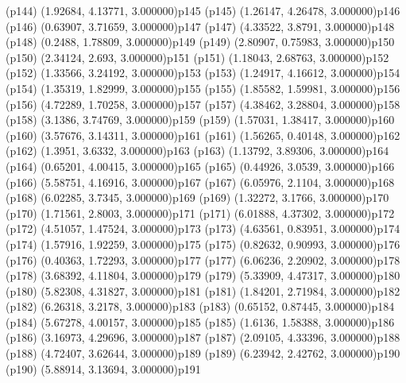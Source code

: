 \psdot(p144)
\psPoint(1.92684, 4.13771, 3.000000){p145}
\psdot(p145)
\psPoint(1.26147, 4.26478, 3.000000){p146}
\psdot(p146)
\psPoint(0.63907, 3.71659, 3.000000){p147}
\psdot(p147)
\psPoint(4.33522, 3.8791, 3.000000){p148}
\psdot(p148)
\psPoint(0.2488, 1.78809, 3.000000){p149}
\psdot(p149)
\psPoint(2.80907, 0.75983, 3.000000){p150}
\psdot(p150)
\psPoint(2.34124, 2.693, 3.000000){p151}
\psdot(p151)
\psPoint(1.18043, 2.68763, 3.000000){p152}
\psdot(p152)
\psPoint(1.33566, 3.24192, 3.000000){p153}
\psdot(p153)
\psPoint(1.24917, 4.16612, 3.000000){p154}
\psdot(p154)
\psPoint(1.35319, 1.82999, 3.000000){p155}
\psdot(p155)
\psPoint(1.85582, 1.59981, 3.000000){p156}
\psdot(p156)
\psPoint(4.72289, 1.70258, 3.000000){p157}
\psdot(p157)
\psPoint(4.38462, 3.28804, 3.000000){p158}
\psdot(p158)
\psPoint(3.1386, 3.74769, 3.000000){p159}
\psdot(p159)
\psPoint(1.57031, 1.38417, 3.000000){p160}
\psdot(p160)
\psPoint(3.57676, 3.14311, 3.000000){p161}
\psdot(p161)
\psPoint(1.56265, 0.40148, 3.000000){p162}
\psdot(p162)
\psPoint(1.3951, 3.6332, 3.000000){p163}
\psdot(p163)
\psPoint(1.13792, 3.89306, 3.000000){p164}
\psdot(p164)
\psPoint(0.65201, 4.00415, 3.000000){p165}
\psdot(p165)
\psPoint(0.44926, 3.0539, 3.000000){p166}
\psdot(p166)
\psPoint(5.58751, 4.16916, 3.000000){p167}
\psdot(p167)
\psPoint(6.05976, 2.1104, 3.000000){p168}
\psdot(p168)
\psPoint(6.02285, 3.7345, 3.000000){p169}
\psdot(p169)
\psPoint(1.32272, 3.1766, 3.000000){p170}
\psdot(p170)
\psPoint(1.71561, 2.8003, 3.000000){p171}
\psdot(p171)
\psPoint(6.01888, 4.37302, 3.000000){p172}
\psdot(p172)
\psPoint(4.51057, 1.47524, 3.000000){p173}
\psdot(p173)
\psPoint(4.63561, 0.83951, 3.000000){p174}
\psdot(p174)
\psPoint(1.57916, 1.92259, 3.000000){p175}
\psdot(p175)
\psPoint(0.82632, 0.90993, 3.000000){p176}
\psdot(p176)
\psPoint(0.40363, 1.72293, 3.000000){p177}
\psdot(p177)
\psPoint(6.06236, 2.20902, 3.000000){p178}
\psdot(p178)
\psPoint(3.68392, 4.11804, 3.000000){p179}
\psdot(p179)
\psPoint(5.33909, 4.47317, 3.000000){p180}
\psdot(p180)
\psPoint(5.82308, 4.31827, 3.000000){p181}
\psdot(p181)
\psPoint(1.84201, 2.71984, 3.000000){p182}
\psdot(p182)
\psPoint(6.26318, 3.2178, 3.000000){p183}
\psdot(p183)
\psPoint(0.65152, 0.87445, 3.000000){p184}
\psdot(p184)
\psPoint(5.67278, 4.00157, 3.000000){p185}
\psdot(p185)
\psPoint(1.6136, 1.58388, 3.000000){p186}
\psdot(p186)
\psPoint(3.16973, 4.29696, 3.000000){p187}
\psdot(p187)
\psPoint(2.09105, 4.33396, 3.000000){p188}
\psdot(p188)
\psPoint(4.72407, 3.62644, 3.000000){p189}
\psdot(p189)
\psPoint(6.23942, 2.42762, 3.000000){p190}
\psdot(p190)
\psPoint(5.88914, 3.13694, 3.000000){p191}
